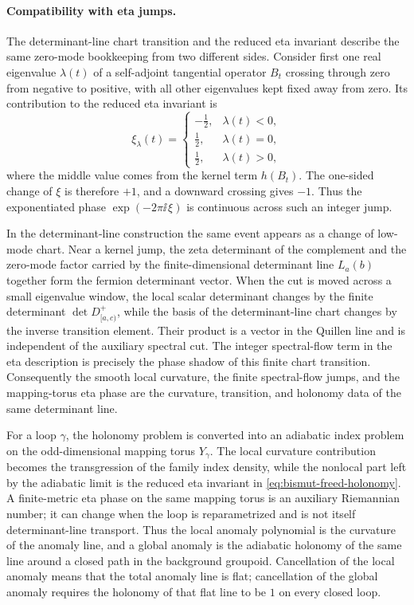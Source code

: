 \paragraph{Compatibility with eta jumps.}
The determinant-line chart transition and the reduced eta invariant describe
the same zero-mode bookkeeping from two different sides.  Consider first one
real eigenvalue \(\lambda(t)\) of a self-adjoint tangential operator \(B_t\)
crossing through zero from negative to positive, with all other eigenvalues
kept fixed away from zero.  Its contribution to the reduced eta invariant is
\[
  \xi_\lambda(t)
  =
  \begin{cases}
    -\frac12, & \lambda(t)<0,\\[2mm]
    \frac12, & \lambda(t)=0,\\[2mm]
    \frac12, & \lambda(t)>0,
  \end{cases}
\]
where the middle value comes from the kernel term \(h(B_t)\).  The
one-sided change of \(\xi\) is therefore \(+1\), and a downward crossing gives
\(-1\).  Thus the exponentiated phase
\(\exp(-2\pi\ii\,\xi)\) is continuous across such an integer jump.

In the determinant-line construction the same event appears as a change of
low-mode chart.  Near a kernel jump, the zeta determinant of the complement
and the zero-mode factor carried by the finite-dimensional determinant line
\(L_a(b)\) together form the fermion determinant vector.  When the cut is
moved across a small eigenvalue window, the local scalar determinant changes
by the finite determinant \(\det D^+_{[a,c)}\), while the basis of the
determinant-line chart changes by the inverse transition element.  Their
product is a vector in the Quillen line and is independent of the auxiliary
spectral cut.  The integer spectral-flow term in the eta description is
precisely the phase shadow of this finite chart transition.  Consequently the
smooth local curvature, the finite spectral-flow jumps, and the
mapping-torus eta phase are the curvature, transition, and holonomy data of
the same determinant line.

For a loop \(\gamma\), the holonomy problem is converted into an adiabatic
index problem on the odd-dimensional mapping torus \(Y_\gamma\).  The local
curvature contribution becomes the transgression of the family index density,
while the nonlocal part left by the adiabatic limit is the reduced eta
invariant in \eqref{eq:bismut-freed-holonomy}.  A finite-metric eta phase on
the same mapping torus is an auxiliary Riemannian number; it can change when
the loop is reparametrized and is not itself determinant-line transport.
Thus the local anomaly polynomial is the curvature of the anomaly line, and
a global anomaly is the adiabatic holonomy of the same line around a closed
path in the background groupoid.  Cancellation of the local anomaly means
that the total anomaly line is flat; cancellation of the global anomaly
requires the holonomy of that flat line to be \(1\) on every closed loop.

